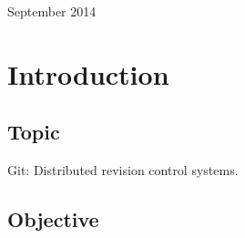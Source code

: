 \documentclass[12pt]{article}
\begin{document}
\begin{titlepage}
\begin{center}
      \vspace{5 mm}


      {\large September 2014}\\[3cm] %




      \vfill %
      \end{center}
      \end{titlepage}



  \section{Introduction}

  \subsection{Topic}

  Git: Distributed revision control systems.

  \subsection{Objective}
\end{document}

